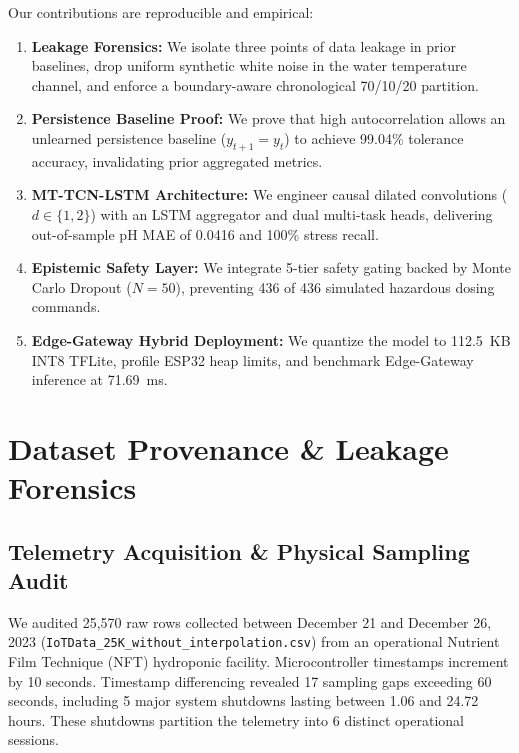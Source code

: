 \documentclass[conference]{IEEEtran}
\begin{document}
Our contributions are reproducible and empirical:
\begin{enumerate}
    \item \textbf{Leakage Forensics:} We isolate three points of data leakage in prior baselines, drop uniform synthetic white noise in the water temperature channel, and enforce a boundary-aware chronological 70/10/20 partition.
    \item \textbf{Persistence Baseline Proof:} We prove that high autocorrelation allows an unlearned persistence baseline ($y_{t+1}=y_t$) to achieve 99.04\% tolerance accuracy, invalidating prior aggregated metrics.
    \item \textbf{MT-TCN-LSTM Architecture:} We engineer causal dilated convolutions ($d \in \{1, 2\}$) with an LSTM aggregator and dual multi-task heads, delivering out-of-sample pH MAE of 0.0416 and 100\% stress recall.
    \item \textbf{Epistemic Safety Layer:} We integrate 5-tier safety gating backed by Monte Carlo Dropout ($N=50$), preventing 436 of 436 simulated hazardous dosing commands.
    \item \textbf{Edge-Gateway Hybrid Deployment:} We quantize the model to 112.5~KB INT8 TFLite, profile ESP32 heap limits, and benchmark Edge-Gateway inference at 71.69~ms.
\end{enumerate}

\section{Dataset Provenance \& Leakage Forensics}

\subsection{Telemetry Acquisition \& Physical Sampling Audit}
We audited 25,570 raw rows collected between December 21 and December 26, 2023 (\texttt{IoTData\_25K\_without\_interpolation.csv}) from an operational Nutrient Film Technique (NFT) hydroponic facility. Microcontroller timestamps increment by 10 seconds. Timestamp differencing revealed 17 sampling gaps exceeding 60 seconds, including 5 major system shutdowns lasting between 1.06 and 24.72 hours. These shutdowns partition the telemetry into 6 distinct operational sessions.
\end{document}
